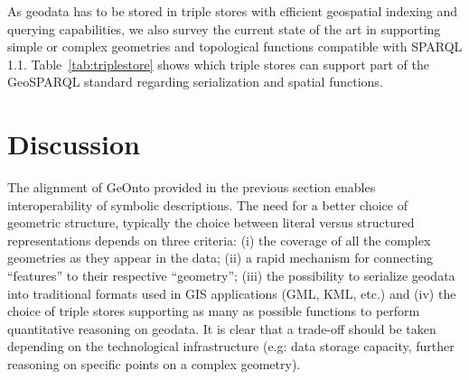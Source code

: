 \documentclass[a4paper,11pt]{report}
\begin{document}
As geodata has to be stored in triple stores with efficient geospatial indexing and querying capabilities, we also survey the current state of the art  in supporting simple or complex geometries and topological functions compatible with SPARQL 1.1. Table~\ref{tab:triplestore} shows which triple stores can support part of the GeoSPARQL standard regarding serialization and spatial functions.



\section{Discussion}
The alignment of GeOnto provided in the previous section enables interoperability of symbolic descriptions. The need for a better choice of geometric structure, typically the choice between literal versus structured representations depends on three criteria: (i) the coverage of all the complex geometries as they appear in the data; (ii) a rapid mechanism for connecting ``features'' to their respective ``geometry''; (iii) the possibility to serialize geodata into traditional formats used in GIS applications (GML, KML, etc.) and (iv) the choice of triple stores supporting as many as possible functions to perform quantitative reasoning on geodata. It is clear that a trade-off should be taken depending on the technological infrastructure (e.g: data storage capacity, further reasoning on specific points on a complex geometry).
\end{document}
